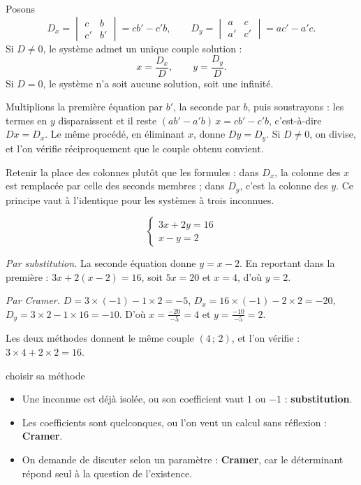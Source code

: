 \begin{theoreme}
Posons
\[
  D_{x} = \begin{vmatrix} c & b\\ c' & b'\end{vmatrix} = cb'-c'b,
  \qquad
  D_{y} = \begin{vmatrix} a & c\\ a' & c'\end{vmatrix} = ac'-a'c .
\]
Si $D \neq 0$, le système admet un unique couple solution :
\[
  x = \frac{D_{x}}{D}, \qquad y = \frac{D_{y}}{D}.
\]
Si $D = 0$, le système n'a soit aucune solution, soit une infinité.
\end{theoreme}

\begin{demonstration}
Multiplions la première équation par $b'$, la seconde par $b$, puis
soustrayons : les termes en $y$ disparaissent et il reste
$(ab'-a'b)\,x = cb'-c'b$, c'est-à-dire $Dx = D_{x}$. Le même procédé, en
éliminant $x$, donne $Dy = D_{y}$. Si $D \neq 0$, on divise, et l'on vérifie
réciproquement que le couple obtenu convient.
\end{demonstration}

\begin{remarque}
Retenir la place des colonnes plutôt que les formules : dans $D_{x}$, la
colonne des $x$ est remplacée par celle des seconds membres ; dans $D_{y}$,
c'est la colonne des $y$. Ce principe vaut à l'identique pour les systèmes à
trois inconnues.
\end{remarque}

\begin{exemple}
\[
  \begin{cases} 3x+2y = 16\\ x-y = 2 \end{cases}
\]

\emph{Par substitution.} La seconde équation donne $y = x-2$. En reportant
dans la première : $3x+2(x-2) = 16$, soit $5x = 20$ et $x = 4$, d'où
$y = 2$.

\emph{Par Cramer.} $D = 3\times(-1)-1\times2 = -5$,
$D_{x} = 16\times(-1)-2\times2 = -20$,
$D_{y} = 3\times2-1\times16 = -10$. D'où
$x = \frac{-20}{-5} = 4$ et $y = \frac{-10}{-5} = 2$.

Les deux méthodes donnent le même couple $(4\,;\,2)$, et l'on vérifie :
$3\times4+2\times2 = 16$. \checkmark
\end{exemple}

\begin{methode}{choisir sa méthode}
\begin{itemize}[leftmargin=1.3em, itemsep=0.2em]
  \item Une inconnue est déjà isolée, ou son coefficient vaut $1$ ou $-1$ :
        \textbf{substitution}.
  \item Les coefficients sont quelconques, ou l'on veut un calcul sans
        réflexion : \textbf{Cramer}.
  \item On demande de discuter selon un paramètre : \textbf{Cramer}, car le
        déterminant répond seul à la question de l'existence.
\end{itemize}
\end{methode}

